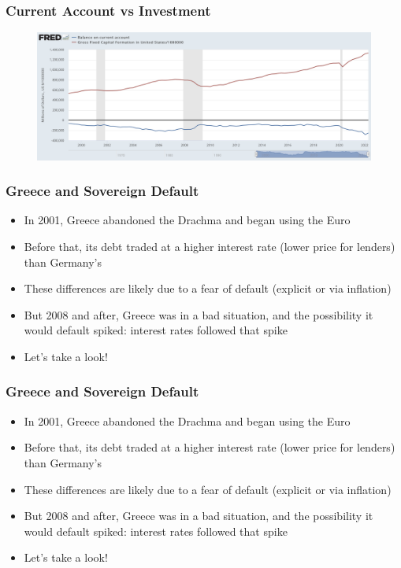 \documentclass{beamer}
\begin{document}
\begin{frame}
\frametitle[alignment=center]{Current Account vs Investment}
\begin{figure}
\centering
\includegraphics[scale=0.27]{Figures/CurrentAccount.png}
\end{figure}
\end{frame}

\begin{frame}
\frametitle[alignment=center]{Greece and Sovereign Default}
\begin{itemize}
\item In 2001, Greece abandoned the Drachma and began using the Euro
\bigskip
\item Before that, its debt traded at a higher interest rate (lower price for lenders) than Germany's
\bigskip
\item These differences are likely due to a fear of default (explicit or via inflation)
\bigskip
\item But 2008 and after, Greece was in a bad situation, and the possibility it would default spiked: interest rates followed that spike 
\bigskip
\item Let's take a look!
\end{itemize}
\end{frame}


\begin{frame}
\frametitle[alignment=center]{Greece and Sovereign Default}
\begin{itemize}
\item In 2001, Greece abandoned the Drachma and began using the Euro
\bigskip
\item Before that, its debt traded at a higher interest rate (lower price for lenders) than Germany's
\bigskip
\item These differences are likely due to a fear of default (explicit or via inflation)
\bigskip
\item But 2008 and after, Greece was in a bad situation, and the possibility it would default spiked: interest rates followed that spike 
\bigskip
\item Let's take a look!
\end{itemize}
\end{frame}
\end{document}

